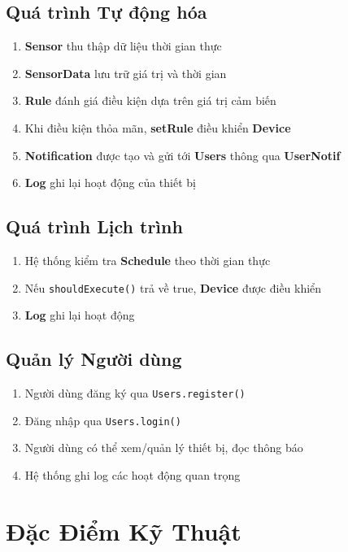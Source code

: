 \documentclass[12pt,a4paper]{article}
\begin{document}
\subsection{Quá trình Tự động hóa}
\begin{enumerate}
    \item \textbf{Sensor} thu thập dữ liệu thời gian thực
    \item \textbf{SensorData} lưu trữ giá trị và thời gian
    \item \textbf{Rule} đánh giá điều kiện dựa trên giá trị cảm biến
    \item Khi điều kiện thỏa mãn, \textbf{setRule} điều khiển \textbf{Device}
    \item \textbf{Notification} được tạo và gửi tới \textbf{Users} thông qua \textbf{UserNotif}
    \item \textbf{Log} ghi lại hoạt động của thiết bị
\end{enumerate}

\subsection{Quá trình Lịch trình}
\begin{enumerate}
    \item Hệ thống kiểm tra \textbf{Schedule} theo thời gian thực
    \item Nếu \texttt{shouldExecute()} trả về true, \textbf{Device} được điều khiển
    \item \textbf{Log} ghi lại hoạt động
\end{enumerate}

\subsection{Quản lý Người dùng}
\begin{enumerate}
    \item Người dùng đăng ký qua \texttt{Users.register()}
    \item Đăng nhập qua \texttt{Users.login()}
    \item Người dùng có thể xem/quản lý thiết bị, đọc thông báo
    \item Hệ thống ghi log các hoạt động quan trọng
\end{enumerate}

\section{Đặc Điểm Kỹ Thuật}
\end{document}
